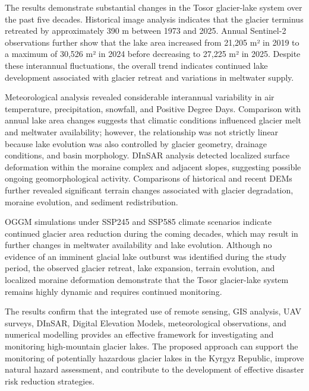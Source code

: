 \documentclass[12pt,a4paper]{report}
\begin{document}
The results demonstrate substantial changes in the Tosor glacier-lake system over the past five decades. Historical image analysis indicates that the glacier terminus retreated by approximately 390 m between 1973 and 2025. Annual Sentinel-2 observations further show that the lake area increased from 21,205 m² in 2019 to a maximum of 30,526 m² in 2024 before decreasing to 27,225 m² in 2025. Despite these interannual fluctuations, the overall trend indicates continued lake development associated with glacier retreat and variations in meltwater supply.

Meteorological analysis revealed considerable interannual variability in air temperature, precipitation, snowfall, and Positive Degree Days. Comparison with annual lake area changes suggests that climatic conditions influenced glacier melt and meltwater availability; however, the relationship was not strictly linear because lake evolution was also controlled by glacier geometry, drainage conditions, and basin morphology. DInSAR analysis detected localized surface deformation within the moraine complex and adjacent slopes, suggesting possible ongoing geomorphological activity. Comparisons of historical and recent DEMs further revealed significant terrain changes associated with glacier degradation, moraine evolution, and sediment redistribution.

OGGM simulations under SSP245 and SSP585 climate scenarios indicate continued glacier area reduction during the coming decades, which may result in further changes in meltwater availability and lake evolution. Although no evidence of an imminent glacial lake outburst was identified during the study period, the observed glacier retreat, lake expansion, terrain evolution, and localized moraine deformation demonstrate that the Tosor glacier-lake system remains highly dynamic and requires continued monitoring.

The results confirm that the integrated use of remote sensing, GIS analysis, UAV surveys, DInSAR, Digital Elevation Models, meteorological observations, and numerical modelling provides an effective framework for investigating and monitoring high-mountain glacier lakes. The proposed approach can support the monitoring of potentially hazardous glacier lakes in the Kyrgyz Republic, improve natural hazard assessment, and contribute to the development of effective disaster risk reduction strategies.



\vspace{\baselineskip}
\end{document}
